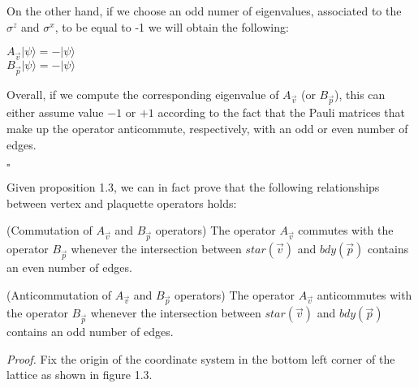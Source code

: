 \documentclass{Configuration_Files/PoliMi3i_thesis}
\begin{document}
On the other hand, if we choose an odd numer of eigenvalues, associated to the $\sigma^z$ and $\sigma^x$, to be equal to -1 we will obtain the following:

\begin{center}
	$A_{\vec{v}} |\psi\rangle = -|\psi\rangle$ \\
	$B_{\vec{p}} |\psi\rangle = -|\psi\rangle$
\end{center}

Overall, if we compute the corresponding eigenvalue of $A_{\vec{v}}$ (or $B_{\vec{p}}$), this can either assume value $-1$ or $+1$ according to the fact that the Pauli matrices that make up the operator anticommute, respectively, with an odd or even number of edges.

\hfill $\square$

Given proposition 1.3, we can in fact prove that the following relationships between vertex and plaquette operators holds:

\begin{proposition} (Commutation of $A_{\vec{v}}$ and $B_{\vec{p}}$ operators) The operator $A_{\vec{v}}$ commutes with the operator $B_{\vec{p}}$ whenever the intersection between $star(\vec{v})$ and $bdy(\vec{p})$ contains an even number of edges.
\end{proposition}


\begin{proposition} (Anticommutation of $A_{\vec{v}}$ and $B_{\vec{p}}$ operators) The operator $A_{\vec{v}}$ anticommutes with the operator $B_{\vec{p}}$ whenever the intersection between $star(\vec{v})$ and $bdy(\vec{p})$ contains an odd number of edges. 
\end{proposition}


\textit{Proof.}\newline 
Fix the origin of the coordinate system in the bottom left corner of the lattice as shown in figure 1.3. 
\end{document}
